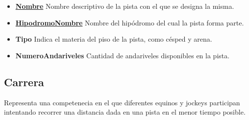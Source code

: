 \documentclass[a4paper,11pt]{article}
\begin{document}
\begin{itemize}

  \item \textbf{\uline{Nombre}} Nombre descriptivo de la pista con el que se
    designa la misma.

  \item \textbf{\uline{HipodromoNombre}} Nombre del hipódromo del
    cual la pista forma parte.

  \item \textbf{Tipo} Indica el materia del piso de la pista, como césped y
    arena.

  \item \textbf{NumeroAndariveles} Cantidad de andariveles disponibles en la
    pista.

\end{itemize}

\subsection{Carrera}

Representa una competenecia en el que diferentes equinos y jockeys participan
intentando recorrer una distancia dada en una pista en el menor tiempo posible.
\end{document}
